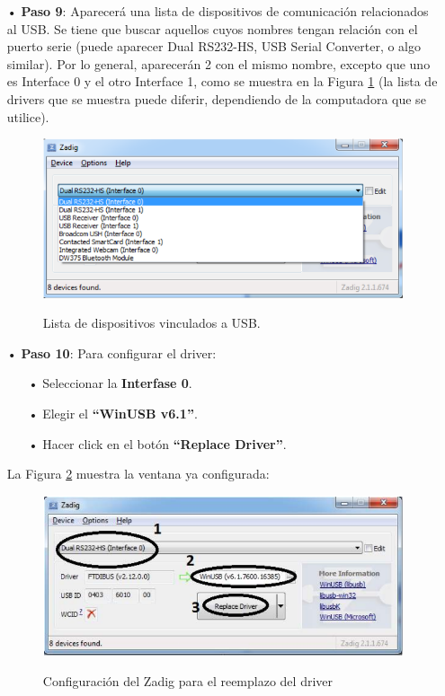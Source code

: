 \documentclass[12pt,letterpaper]{article}
\begin{document}
\begin{enumerate}
\item[•]\textbf{Paso 9}: Aparecerá una lista de dispositivos de comunicación relacionados al USB. Se tiene que buscar aquellos cuyos nombres tengan relación con el puerto serie (puede aparecer Dual RS232-HS, USB Serial Converter, o algo similar). Por lo general, aparecerán 2 con el mismo nombre, excepto que uno es Interface 0 y el otro Interface 1, como se muestra en la Figura \ref{Fig16} (la lista de drivers que se muestra puede diferir, dependiendo de la computadora que se utilice).

\begin{figure}[!h]
\centering
\includegraphics[width=8 cm]{figuras/instalacion14.png}\\
\caption{Lista de dispositivos vinculados a USB.}
\label{Fig16}
\end{figure}

\item[•]\textbf{Paso 10}: Para configurar el driver:

\begin{enumerate}
\item[•]Seleccionar la \textbf{Interfase 0}.
\item[•]Elegir el \textbf{“WinUSB v6.1”}.
\item[•]Hacer click en el botón \textbf{“Replace Driver”}.
\end{enumerate}
La Figura \ref{Fig17} muestra la ventana ya configurada:


\begin{figure}[H]
\centering
\includegraphics[width=13 cm]{figuras/instalacion15.png}\\
\caption{Configuración del Zadig para el reemplazo del driver}
\label{Fig17}
\end{figure}

\end{enumerate}
\end{document}
